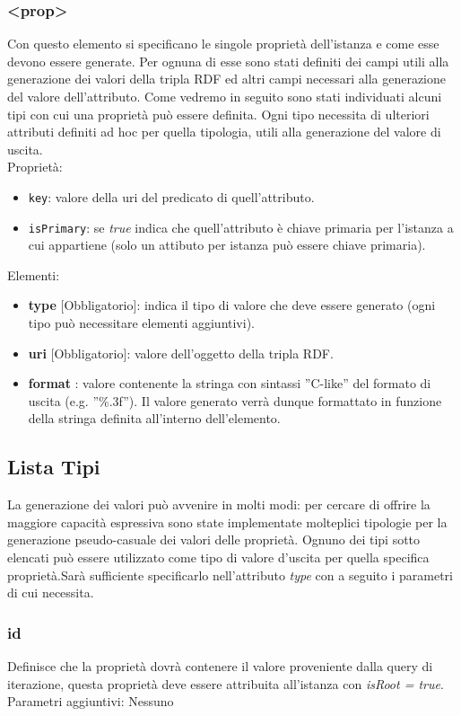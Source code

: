 \documentclass[12pt,a4paper,italian]{article}
\begin{document}
\subsubsection{<prop>}
Con questo elemento si specificano le singole proprietà dell'istanza e come esse devono essere generate. Per ognuna di esse sono stati definiti dei campi utili alla generazione dei valori della tripla RDF ed altri campi necessari alla generazione del valore dell'attributo. Come vedremo in seguito sono stati individuati alcuni tipi con cui una proprietà può essere
definita. Ogni tipo necessita di ulteriori attributi definiti ad hoc per quella tipologia, utili alla generazione del valore di uscita.\\
Proprietà:
\begin{itemize}
\item \texttt{key}: valore della uri del predicato di quell'attributo.
\item \texttt{isPrimary}: se \emph{true} indica che quell'attributo è chiave primaria per l'istanza a cui appartiene (solo un attibuto per istanza può essere chiave primaria).
\end{itemize}
Elementi:
\begin{itemize}
\item \textbf{type} [Obbligatorio]: indica il tipo di valore che deve essere generato (ogni tipo può necessitare elementi aggiuntivi).
\item \textbf{uri} [Obbligatorio]: valore dell'oggetto della tripla RDF.
\item \textbf{format} : valore contenente la stringa con sintassi ''C-like'' del formato di uscita (e.g. ''\%.3f''). Il valore generato verrà dunque formattato in funzione della stringa definita all'interno dell'elemento.
\end{itemize}

\subsection{Lista Tipi}
La generazione dei valori può avvenire in molti modi: per cercare di offrire la maggiore capacità espressiva sono state implementate molteplici tipologie 
per la generazione pseudo-casuale dei valori delle proprietà.
Ognuno dei tipi sotto elencati può essere utilizzato come tipo di valore d'uscita per quella specifica proprietà.Sarà sufficiente specificarlo 
nell'attributo \emph{type} con a seguito i parametri di cui necessita.\\

\subsubsection{id}  Definisce che la proprietà dovrà contenere il valore proveniente dalla query di iterazione, 
questa proprietà deve essere attribuita all'istanza con \emph{isRoot = true}.\\
Parametri aggiuntivi: Nessuno
\end{document}
